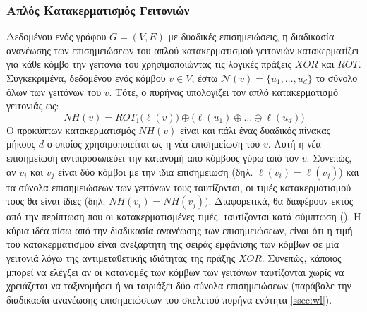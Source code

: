 \subsubsection{Απλός Κατακερματισμός Γειτονιών}
Δεδομένου ενός γράφου $G=(V,E)$ με δυαδικές επισημειώσεις, η διαδικασία ανανέωσης των επισημειώσεων του απλού κατακερματισμού γειτονιών κατακερματίζει για κάθε κόμβο την γειτονιά του χρησιμοποιώντας τις λογικές πράξεις $XOR$ και $ROT$.
Συγκεκριμένα, δεδομένου ενός κόμβου $v \in V$, έστω $\mathcal{N}(v)=\{ u_1,\ldots,u_d \}$ το σύνολο όλων των γειτόνων του $v$.
Τότε, ο πυρήνας υπολογίζει τον απλό κατακερματισμό γειτονιάς ως:
\begin{equation}
    NH(v) = ROT_1 \big( \ell(v) \big) \oplus \big( \ell(u_1) \oplus \ldots \oplus \ell(u_d) \big)
\end{equation}
Ο προκύπτων κατακερματισμός $NH(v)$ είναι και πάλι ένας δυαδικός πίνακας μήκους $d$ ο οποίος χρησιμοποιείται ως η νέα επισημείωση του $v$.
Αυτή η νέα επισημείωση αντιπροσωπεύει την κατανομή από κόμβους γύρω από τον $v$.
Συνεπώς, αν $v_i$ και $v_j$ είναι δύο κόμβοι με την ίδια επισημείωση (δηλ. $\ell(v_i) = \ell(v_j)$) και τα σύνολα επισημειώσεων των γειτόνων τους ταυτίζονται, οι τιμές κατακερματισμού τους θα είναι ίδιες (δηλ. $NH(v_i) = NH(v_j))$.
Διαφορετικά, θα διαφέρουν εκτός από την περίπτωση που οι κατακερματισμένες τιμές, ταυτίζονται κατά σύμπτωση ().
Η κύρια ιδέα πίσω από την διαδικασία ανανέωσης των επισημειώσεων, είναι ότι η τιμή του κατακερματισμού είναι ανεξάρτητη της σειράς εμφάνισης των κόμβων σε μία γειτονιά λόγω της αντιμεταθετικής ιδιότητας της πράξης $XOR$.
Συνεπώς, κάποιος μπορεί να ελέγξει αν οι κατανομές των κόμβων των γειτόνων ταυτίζονται χωρίς να χρειάζεται να ταξινομήσει ή να ταιριάξει δύο σύνολα επισημειώσεων (παράβαλε την διαδικασία ανανέωσης επισημειώσεων του σκελετού πυρήνα  ενότητα \ref{ssec:wl}).

